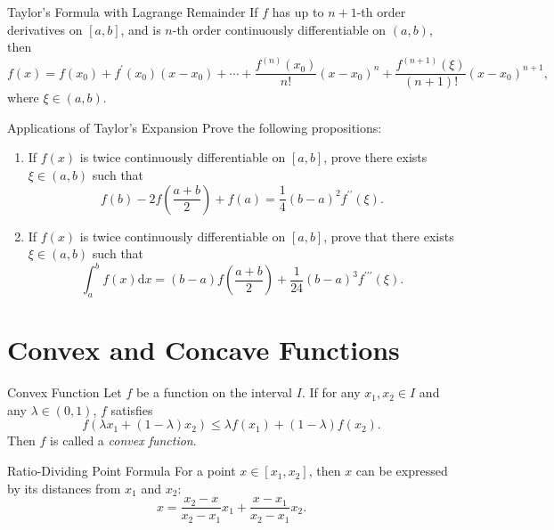 \begin{theorem}{Taylor's Formula with Lagrange Remainder}{}
  If $f$ has up to $n + 1$-th order derivatives on $[a, b]$,
  and is $n$-th order continuously differentiable on $(a, b)$,
  then
  \begin{equation}
    f(x)=f(x_0)+f^{\prime}(x_0)(x-x_0)+\cdots+\frac{f^{(n)}(x_0)}{n!}(x-x_0)^n+\frac{f^{(n+1)}(\xi)}{(n+1)!}(x-x_0)^{n+1},
  \end{equation}
  where $\xi \in (a, b)$.
\end{theorem}

\begin{example}{Applications of Taylor's Expansion}{}
  Prove the following propositions:
  \begin{enumerate}
  \item If $f(x)$ is twice continuously differentiable on $[a, b]$,
    prove there exists $\xi \in (a, b)$ such that
    \begin{equation}
      f(b) - 2 f(\frac{a+b}{2}) + f(a)
      = \frac{1}{4}(b-a)^2 f^{\prime\prime}(\xi).
    \end{equation}
  \item If $f(x)$ is twice continuously differentiable on $[a, b]$,
    prove that there exists $\xi \in (a, b)$ such that
    \begin{equation}
      \int_a^b f(x)\mathrm{d} x
      = (b-a) f(\frac{a+b}{2}) + \frac{1}{24} (b-a)^3 f^{\prime\prime\prime}(\xi).
    \end{equation}
  \end{enumerate}
\end{example}

\section{Convex and Concave Functions}

\begin{definition}{Convex Function}{}
  Let $f$ be a function on the interval $I$.
  If for any $x_1, x_2 \in I$ and any $\lambda \in (0, 1)$,
  $f$ satisfies
  \begin{equation}
    f \left( \lambda x_1 + (1-\lambda)x_2 \right) \leq \lambda f(x_1) + (1-\lambda)f(x_2).
  \end{equation}
  Then $f$ is called a \emph{convex function}.
\end{definition}

\begin{lemma}{Ratio-Dividing Point Formula}{}
  For a point $x \in [x_1, x_2]$, then $x$ can be expressed by
  its distances from $x_1$ and $x_2$:
  \begin{equation}
    x = \frac{x_2 - x}{x_2 - x_1}x_1 + \frac{x - x_1}{x_2 - x_1}x_2.
  \end{equation}
\end{lemma}

